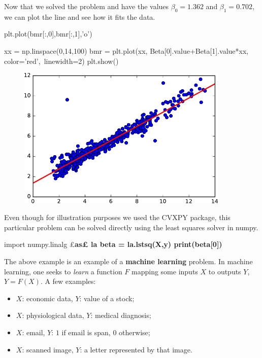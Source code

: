 \begin{example}
Now that we solved the problem and have the values $\beta_0 = 1.362$ and $\beta_1 = 0.702$, we can plot the line and see how it fits the data.

\begin{ipythonnb}[6]
plt.plot(bmr[:,0],bmr[:,1],'o')

xx = np.linspace(0,14,100)
bmr = plt.plot(xx, Beta[0].value+Beta[1].value*xx, color='red',\
 linewidth=2)
plt.show()
\end{ipythonnb}

\begin{figure}[h!]
\centering
\includegraphics[width=0.9\textwidth]{images/bmr2-crop.pdf}
\end{figure}

Even though for illustration purposes we used the CVXPY package, this particular problem can be solved directly using the least squares solver in numpy.

\begin{ipythonnb}[7]
import numpy.linalg £\bfseries\color{kwgreen}as£ la
beta = la.lstsq(X,y)
print(beta[0])
\end{ipythonnb}
\begin{ipythonnboutno}
[ 1.36206997  0.70161692]
\end{ipythonnboutno}
\end{example}

The above example is an example of a \textbf{machine learning} problem. In machine learning, one seeks to {\em learn} a function $F$ mapping some inputs $X$ to outputs $Y$, $Y=F(X)$. A few examples:
\begin{itemize}
\item $X$: economic data, $Y$: value of a stock;
\item $X$: physiological data, $Y$: medical diagnosis;
\item $X$: email, $Y$: $1$ if email is span, $0$ otherwise;
\item $X$: scanned image, $Y$: a letter represented by that image.
\end{itemize}

